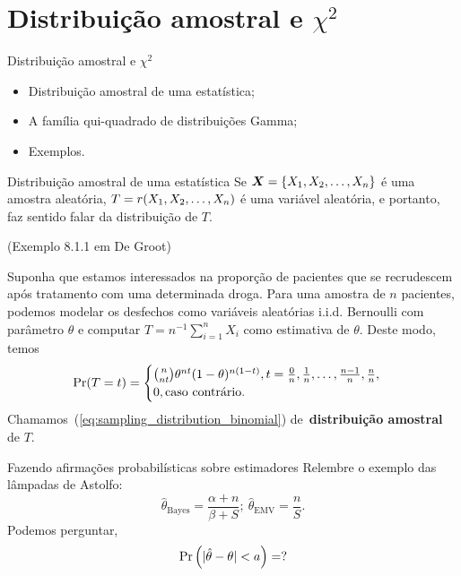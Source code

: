 \section{Distribuição amostral e $\chi^2$}
\begin{frame}{Distribuição amostral e $\chi^2$}
 \begin{itemize}
  \item Distribuição amostral de uma estatística;
  \item A família qui-quadrado de distribuições Gamma;
  \item Exemplos.
 \end{itemize}
\end{frame}
\begin{frame}{Distribuição amostral de uma estatística}
 Se $\boldsymbol{X} = \{ X_1, X_2, \ldots, X_n \}$ é uma amostra aleatória, $T = r(X_1, X_2, \ldots, X_n)$ é uma variável aleatória, e portanto, faz sentido falar da distribuição de $T$.
 \begin{exemplo}
  (Exemplo 8.1.1 em De Groot)
  
  Suponha que estamos interessados na proporção de pacientes que se recrudescem após tratamento com uma determinada droga.
  Para uma amostra de $n$ pacientes, podemos modelar os desfechos como variáveis aleatórias i.i.d. Bernoulli com parâmetro $\theta$ e computar $T = n^{-1}\sum_{i=1}^n X_i$ como estimativa de $\theta$.
  Deste modo, temos
  \begin{equation}
  \label{eq:sampling_distribution_binomial}
   \operatorname{Pr}(T = t) =
    \begin{cases}
    \binom{n}{nt} \theta^{nt} (1-\theta)^{n(1-t)}, t = \frac{0}{n}, \frac{1}{n}, \ldots,\frac{n-1}{n} ,\frac{n}{n},\\
    0,\text{caso contrário}.
    \end{cases}
  \end{equation}
Chamamos~(\ref{eq:sampling_distribution_binomial}) de~\textbf{distribuição amostral} de $T$.
 \end{exemplo}
\end{frame}

\begin{frame}{Fazendo afirmações probabilísticas sobre estimadores}
 Relembre o exemplo das lâmpadas de Astolfo:
 \[ \hat{\theta}_{\text{Bayes}} = \frac{\alpha + n}{\beta + S}; \: \hat{\theta}_{\text{EMV}} = \frac{n}{S}. \]
 Podemos perguntar, 
 \[ \operatorname{Pr}\left(|\hat{\theta} -\theta| < a\right) = ? \]
\end{frame}

